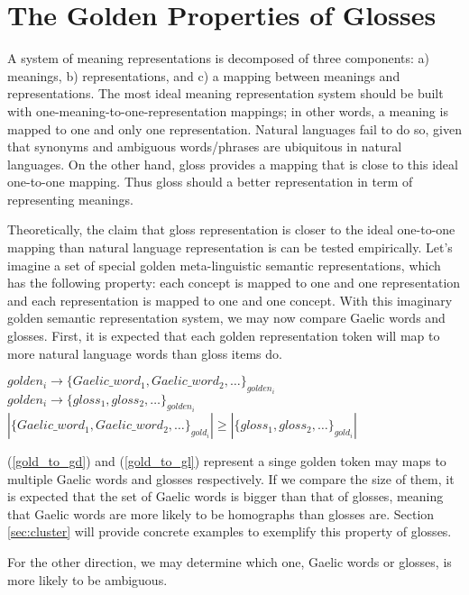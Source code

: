\documentclass[final]{ua-thesis}
\begin{document}
\section{The Golden Properties of Glosses}

A system of meaning representations is decomposed of three components: a) meanings, b) representations, and c) a mapping between meanings and representations. The most ideal meaning representation system should be built with one-meaning-to-one-representation mappings; in other words, a meaning is mapped to one and only one representation. Natural languages fail to do so, given that synonyms and ambiguous words/phrases are ubiquitous in natural languages. On the other hand, gloss provides a mapping that is close to this ideal one-to-one mapping. Thus gloss should a better representation in term of representing meanings. 

Theoretically, the claim that gloss representation is closer to the ideal one-to-one mapping than natural language representation is can be tested empirically. 
Let's imagine a set of special golden meta-linguistic semantic representations, which has the following property: each concept is mapped to one and one representation and each representation is mapped to one and one concept. With this imaginary golden semantic representation system, we may now compare Gaelic words and glosses. First, it is expected that each golden representation token will map to more natural language words than gloss items do.

\begin{exe}
\ex
	\begin{xlist}
	\ex \label{gold_to_gd} $golden_i \rightarrow \{Gaelic\_word_1, Gaelic\_word_2, \ldots\}_{golden_i}$
	\ex\label{gold_to_gl} $golden_i \rightarrow \{gloss_1, gloss_2, \ldots\}_{golden_i}$
	\ex\label{gd_gl_comp1}$ |\{Gaelic\_word_1, Gaelic\_word_2, \ldots\}_{gold_i}| \geq |\{gloss_1, gloss_2, \ldots\}_{gold_i}|$
	\end{xlist}
\end{exe}

(\ref{gold_to_gd}) and (\ref{gold_to_gl}) represent a singe golden token may maps to multiple Gaelic words and glosses respectively. If we compare the size of them, it is expected that the set of Gaelic words is bigger than that of glosses, meaning that Gaelic words are more likely to be homographs than glosses are. Section \ref{sec:cluster} will provide concrete examples to exemplify this property of glosses. 

For the other direction, we may determine which one, Gaelic words or glosses, is more likely to be ambiguous.   
\end{document}
